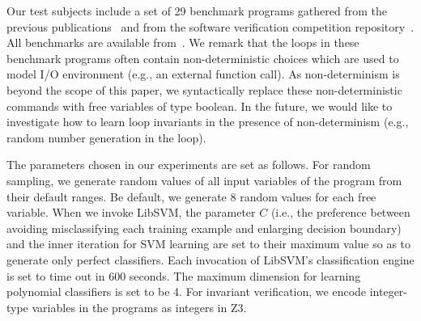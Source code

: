 Our test subjects include a set of 29 benchmark programs %
gathered  from the previous publications~\cite{???} and from
 the software verification competition repository~\cite{Dirk:SVCOMP:2016}.
All benchmarks are available from~\cite{zilu}.
We remark that the loops in these benchmark programs often contain non-deterministic choices
which are used to model I/O environment (e.g., an external function call).
As non-determinism is beyond the scope of this paper, we syntactically replace these non-deterministic commands with free variables of type boolean. In the future, we would like to investigate how to learn loop invariants in the presence of non-determinism (e.g., random number generation in the loop).

The parameters chosen in our experiments are set as follows. For random sampling, we generate random values of all input variables of the program from their default ranges. Be default, we generate 8 random values for each free variable.
When we invoke LibSVM, the parameter $C$ (i.e., the preference between avoiding misclassifying each training example and enlarging decision boundary) and the inner iteration for SVM learning are set to their maximum value so as to generate only perfect classifiers. Each invocation of LibSVM's classification engine is set to time out in 600 seconds. The maximum dimension for learning polynomial classifiers is set to be 4. For invariant verification, we encode integer-type variables in the programs as integers in Z3.


